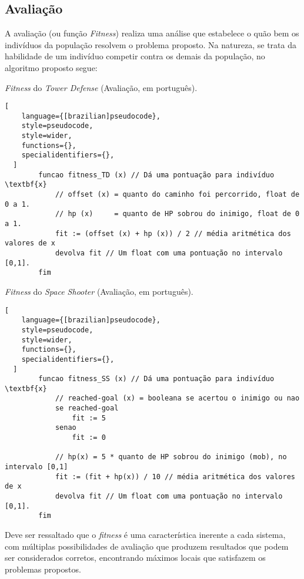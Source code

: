 \subsection{Avaliação}
\label{sec:ag-avaliacao}

A avaliação (ou função \textit{Fitness}) realiza uma análise que estabelece o quão bem os indivíduos da população resolvem o problema proposto. Na natureza, se trata da habilidade de um indivíduo competir contra os demais da população, no algoritmo proposto segue:

\begin{programruledcaption}{\textit{Fitness} do \textit{Tower Defense} (Avaliação, em português).\label{prog:avaliacao_TD}}
  \begin{lstlisting}[
    language={[brazilian]pseudocode},
    style=pseudocode,
    style=wider,
    functions={},
    specialidentifiers={},
  ]
        funcao fitness_TD (x) // Dá uma pontuação para indivíduo \textbf{x}
            // offset (x) = quanto do caminho foi percorrido, float de 0 a 1.
            // hp (x)     = quanto de HP sobrou do inimigo, float de 0 a 1.
	        fit := (offset (x) + hp (x)) / 2 // média aritmética dos valores de x
	        devolva fit // Um float com uma pontuação no intervalo [0,1].
        fim
  \end{lstlisting}
\end{programruledcaption}

\begin{programruledcaption}{\textit{Fitness} do \textit{Space Shooter} (Avaliação, em português).\label{prog:avaliacao_SS}}
  \begin{lstlisting}[
    language={[brazilian]pseudocode},
    style=pseudocode,
    style=wider,
    functions={},
    specialidentifiers={},
  ]
        funcao fitness_SS (x) // Dá uma pontuação para indivíduo \textbf{x}
            // reached-goal (x) = booleana se acertou o inimigo ou nao
            se reached-goal
                fit := 5
            senao
                fit := 0
            
            // hp(x) = 5 * quanto de HP sobrou do inimigo (mob), no intervalo [0,1]
	        fit := (fit + hp(x)) / 10 // média aritmética dos valores de x
	        devolva fit // Um float com uma pontuação no intervalo [0,1].
        fim
  \end{lstlisting}
\end{programruledcaption}

Deve ser ressaltado que o \textit{fitness} é uma característica inerente a cada sistema, com múltiplas possibilidades de avaliação que produzem resultados que podem ser considerados corretos, encontrando máximos locais que satisfazem os problemas propostos.

